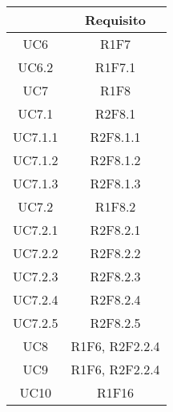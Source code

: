 \begin{table}[H]
	\centering
	\renewcommand{\arraystretch}{1.8}
	\begin{tabular}{c | c}
		\rowcolor[HTML]{125E28}
		\multicolumn{1}{c}{\color[HTML]{FFFFFF} \textbf{Fonte}} &
		\multicolumn{1}{c}{\color[HTML]{FFFFFF} \textbf{Requisito}}                                \\
		\hline
		UC6                                                     & R1F7                             \\ \hline
		UC6.2                                                   & R1F7.1                           \\ \hline
		UC7                                                     & R1F8                             \\ \hline
		UC7.1                                                   & R2F8.1                           \\ \hline
		UC7.1.1                                                 & R2F8.1.1                         \\ \hline
		UC7.1.2                                                 & R2F8.1.2                         \\ \hline
		UC7.1.3                                                 & R2F8.1.3                         \\ \hline
		UC7.2                                                   & R1F8.2                           \\ \hline
		UC7.2.1                                                 & R2F8.2.1                         \\ \hline
		UC7.2.2                                                 & R2F8.2.2                         \\ \hline
		UC7.2.3                                                 & R2F8.2.3                         \\ \hline
		UC7.2.4                                                 & R2F8.2.4                         \\ \hline
		UC7.2.5                                                 & R2F8.2.5                         \\ \hline
		UC8                                                     & R1F6, R2F2.2.4                   \\ \hline
		UC9                                                     & R1F6, R2F2.2.4                   \\ \hline
		UC10                                                    & R1F16                            \\ \hline

\end{tabular}
\end{table}
